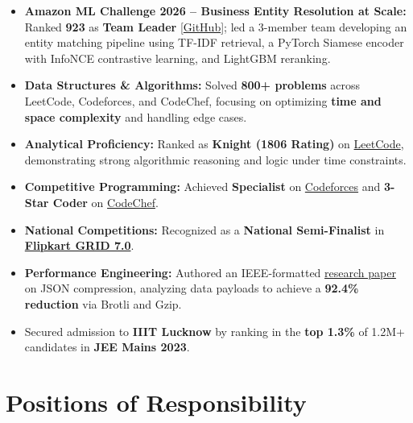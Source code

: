 \documentclass[a4paper,10pt]{article}
\begin{document}
\begin{itemize}[leftmargin=*,itemsep=0.12em,topsep=0pt,parsep=0pt,partopsep=0pt]

\item
\textbf{Amazon ML Challenge 2026 -- Business Entity Resolution at Scale:}
Ranked \textbf{923} as \textbf{Team Leader} [\href{https://github.com/RahulBharadwaz/Amazon_ML_Challenge_2026}{GitHub}];
led a 3-member team developing an entity matching pipeline using TF-IDF retrieval, a PyTorch Siamese encoder with InfoNCE contrastive learning, and LightGBM reranking.

\item
\textbf{Data Structures \& Algorithms:}
Solved \textbf{800+ problems} across LeetCode, Codeforces, and CodeChef,
focusing on optimizing \textbf{time and space complexity} and handling edge cases.

\item
\textbf{Analytical Proficiency:}
Ranked as \textbf{Knight (1806 Rating)} on
\href{https://leetcode.com/u/IwjYVQOItT/}{LeetCode},
demonstrating strong algorithmic reasoning and logic under time constraints.

\item
\textbf{Competitive Programming:}
Achieved \textbf{Specialist} on
\href{https://codeforces.com/profile/rahulbharadwaz27}{Codeforces}
and \textbf{3-Star Coder} on
\href{https://www.codechef.com/users/valid_dell_97}{CodeChef}.

\item
\textbf{National Competitions:}
Recognized as a \textbf{National Semi-Finalist} in
\href{https://drive.google.com/file/d/12FcsCX1a0cg3yAecv4fqyxUC9W_tMv51/view?usp=drivesdk}{\textbf{Flipkart GRID 7.0}}.

\item
\textbf{Performance Engineering:}
Authored an IEEE-formatted
\href{https://drive.google.com/file/d/11uGbiELEiKzqAruxE1okgrUZhqORHByW/view?usp=drivesdk}{research paper}
on JSON compression, analyzing data payloads to achieve a
\textbf{92.4\% reduction} via Brotli and Gzip.

\item
Secured admission to \textbf{IIIT Lucknow} by ranking in the
\textbf{top 1.3\%} of 1.2M+ candidates in \textbf{JEE Mains 2023}.

\end{itemize}

\vspace{-2pt}

\section{Positions of Responsibility}
\end{document}
